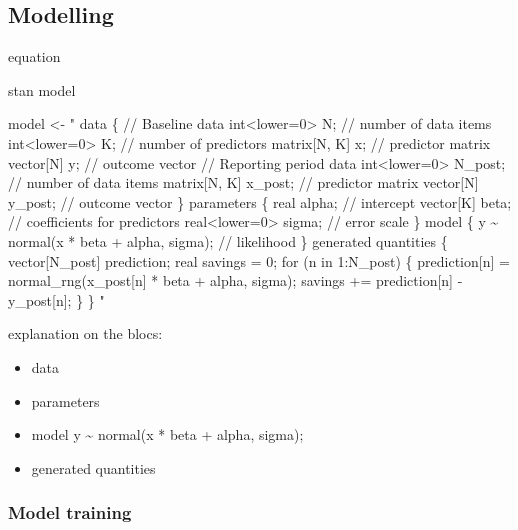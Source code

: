 \documentclass[
]{article}
\newenvironment{Shaded}{\begin{snugshade}}{\end{snugshade}}
\newcommand{\NormalTok}[1]{#1}
\newcommand{\OtherTok}[1]{\textcolor[rgb]{0.56,0.35,0.01}{#1}}
\newcommand{\StringTok}[1]{\textcolor[rgb]{0.31,0.60,0.02}{#1}}
\providecommand{\tightlist}{%
  \setlength{\itemsep}{0pt}\setlength{\parskip}{0pt}}
\begin{document}
\hypertarget{modelling}{%
\subsection{Modelling}\label{modelling}}

equation

stan model

\begin{Shaded}
\begin{Highlighting}[]
\NormalTok{model }\OtherTok{\textless{}{-}} \StringTok{"}
\StringTok{data \{}
\StringTok{// Baseline data}
\StringTok{  int\textless{}lower=0\textgreater{} N;     // number of data items}
\StringTok{  int\textless{}lower=0\textgreater{} K;     // number of predictors}
\StringTok{  matrix[N, K] x;     // predictor matrix}
\StringTok{  vector[N] y;        // outcome vector}
\StringTok{// Reporting period data}
\StringTok{  int\textless{}lower=0\textgreater{} N\_post;  // number of data items}
\StringTok{  matrix[N, K] x\_post;     // predictor matrix}
\StringTok{  vector[N] y\_post;        // outcome vector}
\StringTok{\}}
\StringTok{parameters \{}
\StringTok{  real alpha;           // intercept}
\StringTok{  vector[K] beta;       // coefficients for predictors}
\StringTok{  real\textless{}lower=0\textgreater{} sigma;  // error scale}
\StringTok{ \}}
\StringTok{model \{}
\StringTok{  y \textasciitilde{} normal(x * beta + alpha, sigma);  // likelihood}
\StringTok{\}}
\StringTok{generated quantities \{}
\StringTok{  vector[N\_post] prediction;}
\StringTok{  real savings = 0;}
\StringTok{  for (n in 1:N\_post) \{}
\StringTok{    prediction[n] = normal\_rng(x\_post[n] * beta + alpha, sigma);}
\StringTok{    savings += prediction[n] {-} y\_post[n];}
\StringTok{  \}}
\StringTok{\}}
\StringTok{"}
\end{Highlighting}
\end{Shaded}

explanation on the blocs:

\begin{itemize}
\tightlist
\item
  data
\item
  parameters
\item
  model y \textasciitilde{} normal(x * beta + alpha, sigma);
\item
  generated quantities
\end{itemize}

\hypertarget{model-training}{%
\subsubsection{Model training}\label{model-training}}
\end{document}
